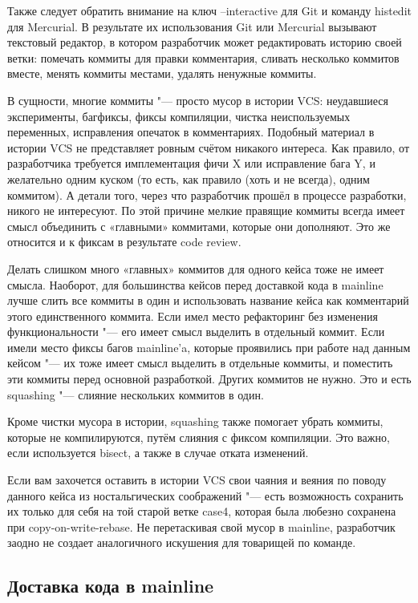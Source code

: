 \documentclass[10pt, a5paper]{article}
\begin{document}
Также следует обратить внимание на ключ --interactive для Git и команду histedit для Mercurial. В результате их использования Git или Mercurial вызывают текстовый редактор, в котором разработчик может редактировать историю своей ветки: помечать коммиты для правки комментария, сливать несколько коммитов вместе, менять коммиты местами, удалять ненужные коммиты.

В сущности, многие коммиты "--- просто мусор в истории VCS: неудавшиеся эксперименты, багфиксы, фиксы компиляции, чистка неиспользуемых переменных, исправления опечаток в комментариях. Подобный материал в истории VCS не представляет ровным счётом никакого интереса. Как правило, от разработчика требуется имплементация фичи X или исправление бага Y, и желательно одним куском (то есть, как правило (хоть и не всегда), одним коммитом). А детали того, через что разработчик прошёл в процессе разработки, никого не интересуют. По этой причине мелкие правящие коммиты всегда имеет смысл объединить с «главными» коммитами, которые они дополняют. Это же относится и к фиксам в результате code review.

Делать слишком много «главных» коммитов для одного кейса тоже не имеет смысла. Наоборот, для большинства кейсов перед доставкой кода в mainline лучше слить все коммиты в один и использовать название кейса как комментарий этого единственного коммита. Если имел место рефакторинг без изменения функциональности "--- его имеет смысл выделить в отдельный коммит. Если имели место фиксы багов mainline'a, которые проявились при работе над данным кейсом "--- их тоже имеет смысл выделить в отдельные коммиты, и поместить эти коммиты перед основной разработкой. Других коммитов не нужно. Это и есть squashing "--- слияние нескольких коммитов в один.

Кроме чистки мусора в истории, squashing также помогает убрать коммиты, которые не компилируются, путём слияния с фиксом компиляции. Это важно, если  используется bisect, а также в случае отката изменений.

Если вам захочется оставить в истории VCS свои чаяния и веяния по поводу данного кейса из ностальгических соображений "--- есть возможность сохранить их только для себя на той старой ветке case4, которая была любезно сохранена при copy-on-write-rebase. Не перетаскивая свой мусор в mainline, разработчик заодно не создает аналогичного искушения для товарищей по команде.

\subsection*{Доставка кода в mainline}
\end{document}
